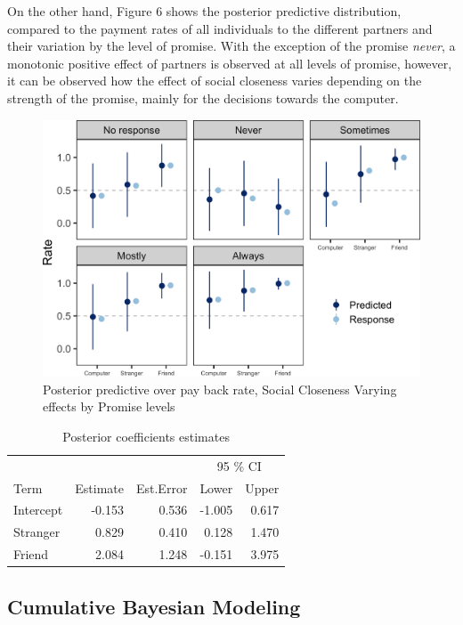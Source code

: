 \documentclass[12pt,]{article}
\begin{document}
On the other hand, Figure 6 shows the posterior predictive distribution,
compared to the payment rates of all individuals to the different
partners and their variation by the level of promise. With the exception
of the promise \emph{never}, a monotonic positive effect of partners is
observed at all levels of promise, however, it can be observed how the
effect of social closeness varies depending on the strength of the
promise, mainly for the decisions towards the computer.

\begin{figure}

{\centering \includegraphics[width=0.8\linewidth]{article_english_files/figure-latex/fig6-1} 

}

\caption{Posterior predictive over pay back rate, Social Closeness Varying effects by Promise levels}\label{fig:fig6}
\end{figure}

\begin{table}[!h]

\caption{\label{tab:tabla}Posterior coefficients estimates}
\centering
\begin{tabular}{lrrrr}
\toprule
\multicolumn{1}{c}{ } & \multicolumn{2}{c}{ } & \multicolumn{2}{c}{95 \% CI} \\
\cmidrule(l{3pt}r{3pt}){4-5}
Term & Estimate & Est.Error & Lower & Upper\\
\midrule
Intercept & -0.153 & 0.536 & -1.005 & 0.617\\
Stranger & 0.829 & 0.410 & 0.128 & 1.470\\
Friend & 2.084 & 1.248 & -0.151 & 3.975\\
\bottomrule
\end{tabular}
\end{table}

\hypertarget{cumulative-bayesian-modeling}{%
\subsection{Cumulative Bayesian
Modeling}\label{cumulative-bayesian-modeling}}
\end{document}
